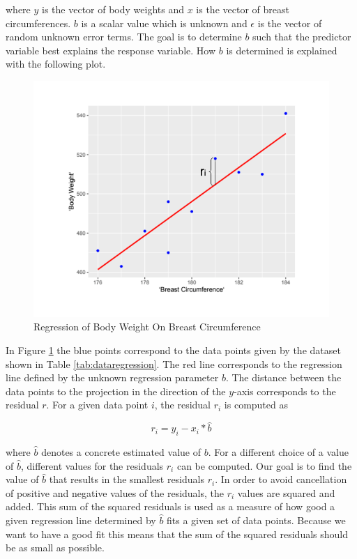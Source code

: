 \documentclass[]{book}
\theoremstyle{definition}
\theoremstyle{definition}
\theoremstyle{definition}
\theoremstyle{remark}
\begin{document}
where \(y\) is the vector of body weights and \(x\) is the vector of breast circumferences. \(b\) is a scalar value which is unknown and \(\epsilon\) is the vector of random unknown error terms. The goal is to determine \(b\) such that the predictor variable best explains the response variable. How \(b\) is determined is explained with the following plot.

\begin{figure}
\centering
\includegraphics{odg/showregressionbwonbc.png}
\caption{\label{fig:showregressionbwonbc}Regression of Body Weight On Breast Circumference}
\end{figure}

In Figure \ref{fig:showregressionbwonbc} the blue points correspond to the data points given by the dataset shown in Table \ref{tab:dataregression}. The red line corresponds to the regression line defined by the unknown regression parameter \(b\). The distance between the data points to the projection in the direction of the \(y\)-axis corresponds to the residual \(r\). For a given data point \(i\), the residual \(r_i\) is computed as

\begin{equation}
  r_i = y_i - x_i * \hat{b}
  \label{eq:definitionresidual}
\end{equation}

where \(\hat{b}\) denotes a concrete estimated value of \(b\). For a different choice of a value of \(\hat{b}\), different values for the residuals \(r_i\) can be computed. Our goal is to find the value of \(\hat{b}\) that results in the smallest residuals \(r_i\). In order to avoid cancellation of positive and negative values of the residuals, the \(r_i\) values are squared and added. This sum of the squared residuals is used as a measure of how good a given regression line determined by \(\hat{b}\) fits a given set of data points. Because we want to have a good fit this means that the sum of the squared residuals should be as small as possible.
\end{document}

